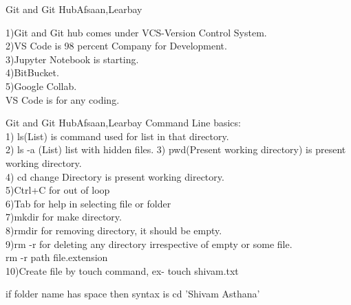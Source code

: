 \documentclass[aspectratio=169, 10pt]{beamer}
\begin{document}
\begin{frame}{Git and Git Hub}{Afsaan,Learbay}

1)Git and Git hub comes under VCS-Version Control System.\\
2)VS Code is 98 percent Company for Development.\\
3)Jupyter Notebook is starting.\\
4)BitBucket.\\
5)Google Collab.\\

\vspace{1 cm}
VS Code is for any coding.\\
\end{frame}

\begin{frame}[t]{Git and Git Hub}{Afsaan,Learbay}
Command Line basics:\\  \vspace{0.25 cm}
1) ls(List) is command used for list in that directory.\\
2) ls -a (List) list with hidden files.
3) pwd(Present working directory) is present working directory.\\
4) cd change Directory is present working directory.\\
5)Ctrl+C for out of loop\\
6)Tab for help in selecting  file or folder\\
7)mkdir for make directory.\\
8)rmdir for removing directory, it should be empty.\\
9)rm -r for deleting any directory irrespective of empty or some file.\\
\hspace*{1cm} rm -r path file.extension\\
10)Create file by touch command, ex- touch shivam.txt  
  
if folder name has space then syntax is cd 'Shivam Asthana'

\end{frame}
\end{document}
